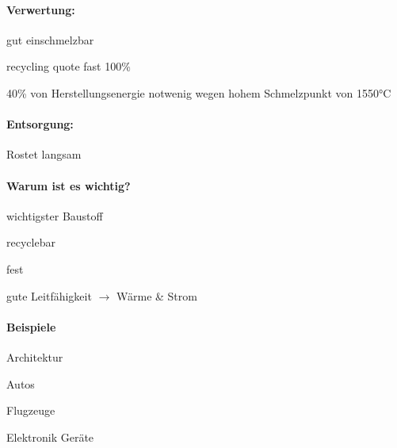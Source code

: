 \documentclass{article}
\begin{document}
\begin{multicols}{3}
\paragraph{Verwertung:}
\begin{compactitem}
  \item gut einschmelzbar
  \item recycling quote fast 100\%
  \item 40\% von Herstellungsenergie notwenig wegen hohem Schmelzpunkt von 1550°C
\end{compactitem}

\paragraph{Entsorgung:}
\begin{compactitem}
  \item Rostet langsam
\end{compactitem}

\paragraph{Warum ist es wichtig?}
\begin{compactitem}
  \item wichtigster Baustoff
  \item recyclebar
  \item fest
  \item gute Leitfähigkeit
  \subitem $\to$ Wärme \& Strom
\end{compactitem}

\paragraph{Beispiele}
\begin{compactitem}
  \item Architektur
  \item Autos
  \item Flugzeuge
  \item Elektronik Geräte
\end{compactitem}
\end{multicols}


\clearpage

\newpage
\pagestyle{fancy}
\fancyhf{}
\end{document}
